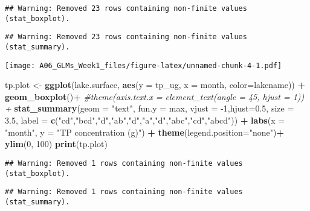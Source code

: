 \documentclass[]{article}
\newenvironment{Shaded}{\begin{snugshade}}{\end{snugshade}}
\newcommand{\CommentTok}[1]{\textcolor[rgb]{0.56,0.35,0.01}{\textit{#1}}}
\newcommand{\DataTypeTok}[1]{\textcolor[rgb]{0.13,0.29,0.53}{#1}}
\newcommand{\DecValTok}[1]{\textcolor[rgb]{0.00,0.00,0.81}{#1}}
\newcommand{\FloatTok}[1]{\textcolor[rgb]{0.00,0.00,0.81}{#1}}
\newcommand{\KeywordTok}[1]{\textcolor[rgb]{0.13,0.29,0.53}{\textbf{#1}}}
\newcommand{\NormalTok}[1]{#1}
\newcommand{\OperatorTok}[1]{\textcolor[rgb]{0.81,0.36,0.00}{\textbf{#1}}}
\newcommand{\StringTok}[1]{\textcolor[rgb]{0.31,0.60,0.02}{#1}}
\begin{document}
\begin{verbatim}
## Warning: Removed 23 rows containing non-finite values (stat_boxplot).
\end{verbatim}

\begin{verbatim}
## Warning: Removed 23 rows containing non-finite values (stat_summary).
\end{verbatim}

\texttt{[image: A06\_GLMs\_Week1\_files/figure-latex/unnamed-chunk-4-1.pdf]}

\begin{Shaded}
\begin{Highlighting}[]
\NormalTok{tp.plot <-}\StringTok{ }\KeywordTok{ggplot}\NormalTok{(lake.surface, }\KeywordTok{aes}\NormalTok{(}\DataTypeTok{y =}\NormalTok{ tp_ug, }\DataTypeTok{x =}\NormalTok{ month, }\DataTypeTok{color=}\NormalTok{lakename)) }\OperatorTok{+}
\StringTok{  }\KeywordTok{geom_boxplot}\NormalTok{()}\OperatorTok{+}
\StringTok{  }\CommentTok{#theme(axis.text.x = element_text(angle = 45, hjust = 1)) +}
\StringTok{  }\KeywordTok{stat_summary}\NormalTok{(}\DataTypeTok{geom =} \StringTok{"text"}\NormalTok{, }\DataTypeTok{fun.y =}\NormalTok{ max, }\DataTypeTok{vjust =} \DecValTok{-1}\NormalTok{,}\DataTypeTok{hjust=}\FloatTok{0.5}\NormalTok{, }\DataTypeTok{size =} \FloatTok{3.5}\NormalTok{,}
               \DataTypeTok{label =} \KeywordTok{c}\NormalTok{(}\StringTok{"cd"}\NormalTok{,}\StringTok{"bcd"}\NormalTok{,}\StringTok{"d"}\NormalTok{,}\StringTok{"ab"}\NormalTok{,}\StringTok{"d"}\NormalTok{,}\StringTok{"a"}\NormalTok{,}\StringTok{"d"}\NormalTok{,}\StringTok{"abc"}\NormalTok{,}\StringTok{"cd"}\NormalTok{,}\StringTok{"abcd"}\NormalTok{)) }\OperatorTok{+}
\StringTok{  }\KeywordTok{labs}\NormalTok{(}\DataTypeTok{x =} \StringTok{"month"}\NormalTok{, }\DataTypeTok{y =} \StringTok{"TP concentration (g)"}\NormalTok{) }\OperatorTok{+}
\StringTok{  }\KeywordTok{theme}\NormalTok{(}\DataTypeTok{legend.position=}\StringTok{"none"}\NormalTok{)}\OperatorTok{+}
\StringTok{  }\KeywordTok{ylim}\NormalTok{(}\DecValTok{0}\NormalTok{, }\DecValTok{100}\NormalTok{)}
\KeywordTok{print}\NormalTok{(tp.plot)}
\end{Highlighting}
\end{Shaded}

\begin{verbatim}
## Warning: Removed 1 rows containing non-finite values (stat_boxplot).
\end{verbatim}

\begin{verbatim}
## Warning: Removed 1 rows containing non-finite values (stat_summary).
\end{verbatim}
\end{document}
